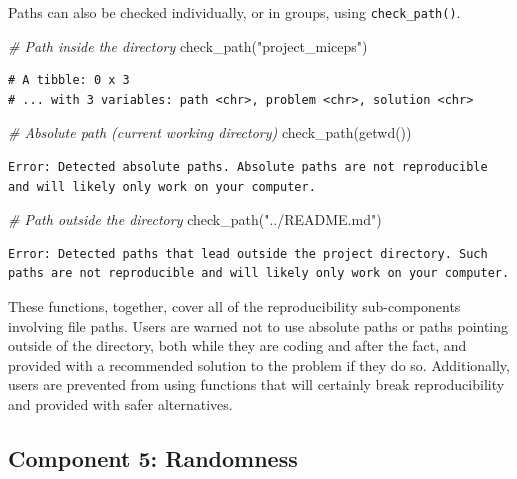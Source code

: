 \documentclass[12pt,twoside]{reedthesis}
\newenvironment{Shaded}{\begin{snugshade}}{\end{snugshade}}
\newcommand{\CommentTok}[1]{\textcolor[rgb]{0.56,0.35,0.01}{\textit{#1}}}
\newcommand{\FunctionTok}[1]{\textcolor[rgb]{0.00,0.00,0.00}{#1}}
\newcommand{\NormalTok}[1]{#1}
\newcommand{\StringTok}[1]{\textcolor[rgb]{0.31,0.60,0.02}{#1}}
\begin{document}
Paths can also be checked individually, or in groups, using \texttt{check\_path()}.
\begin{Shaded}
\begin{Highlighting}[]
\CommentTok{\# Path inside the directory}
\FunctionTok{check\_path}\NormalTok{(}\StringTok{"project\_miceps"}\NormalTok{)}
\end{Highlighting}
\end{Shaded}
\begin{verbatim}
# A tibble: 0 x 3
# ... with 3 variables: path <chr>, problem <chr>, solution <chr>
\end{verbatim}
\begin{Shaded}
\begin{Highlighting}[]
\CommentTok{\# Absolute path (current working directory)}
\FunctionTok{check\_path}\NormalTok{(}\FunctionTok{getwd}\NormalTok{())}
\end{Highlighting}
\end{Shaded}
\begin{verbatim}
Error: Detected absolute paths. Absolute paths are not reproducible
and will likely only work on your computer.
\end{verbatim}
\begin{Shaded}
\begin{Highlighting}[]
\CommentTok{\# Path outside the directory}
\FunctionTok{check\_path}\NormalTok{(}\StringTok{"../README.md"}\NormalTok{)}
\end{Highlighting}
\end{Shaded}
\begin{verbatim}
Error: Detected paths that lead outside the project directory. Such
paths are not reproducible and will likely only work on your computer.
\end{verbatim}
These functions, together, cover all of the reproducibility sub-components involving file paths. Users are warned not to use absolute paths or paths pointing outside of the directory, both while they are coding and after the fact, and provided with a recommended solution to the problem if they do so. Additionally, users are prevented from using functions that will certainly break reproducibility and provided with safer alternatives.

\hypertarget{component-5-randomness}{%
\subsection{Component 5: Randomness}\label{component-5-randomness}}
\end{document}
